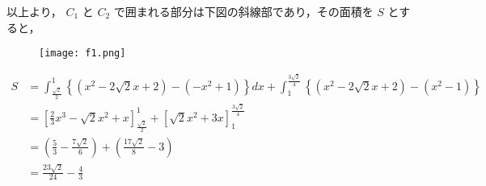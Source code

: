 \documentclass[a4paper]{ltjsarticle}
\begin{document}
以上より， $C_1$ と $C_2$ で囲まれる部分は下図の斜線部であり，その面積を $S$ とすると，

\begin{figure}[!ht]
    \centering
    \texttt{[image: f1.png]}
\end{figure}

\begin{align*}
    S & =\int_{\frac{\sqrt{2}}{2}}^1\left\{(x^2-2\sqrt{2}x+2)-(-x^2+1)\right\}dx+\int_1^{\frac{3\sqrt{2}}{4}}\left\{(x^2-2\sqrt{2}x+2)-(x^2-1)\right\} \\
      & =\left[\frac{2}{3}x^3-\sqrt{2}x^2+x\right]_{\frac{\sqrt{2}}{2}}^1+\left[\sqrt{2}x^2+3x\right]_1^{\frac{3\sqrt{2}}{4}}                          \\
      & =\left(\frac{5}{3}-\frac{7\sqrt{2}}{6}\right)+\left(\frac{17\sqrt{2}}{8}-3\right)                                                              \\
      & =\frac{23\sqrt{2}}{24}-\frac{4}{3}
\end{align*}
\end{document}
